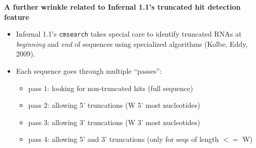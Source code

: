 \documentclass[landscape]{slides}
\begin{document}
\begin{slide}
\begin{center}
\small
\textbf{A further wrinkle related to Infernal 1.1's truncated hit
  detection feature}
\end{center}

\small
\begin{itemize}
\item Infernal 1.1's \texttt{cmsearch} takes special care to identify
  truncated RNAs at \emph{beginning} and \emph{end} of sequences using specialized
  algorithms (Kolbe, Eddy, 2009).
\item Each sequence goes through multiple ``passes'': 
  \begin {itemize}
  \item pass 1: looking for non-truncated hits (full sequence)
  \item pass 2: allowing 5' truncations (W 5' most nucleotides)
  \item pass 3: allowing 3' truncations (W 3' most nucleotides)
  \item pass 4: allowing 5' and 3' truncations (only for seqs of
    length $<=$ W)
  \end{itemize}
\end{itemize}

\vfill
\end{slide}
\end{document}

